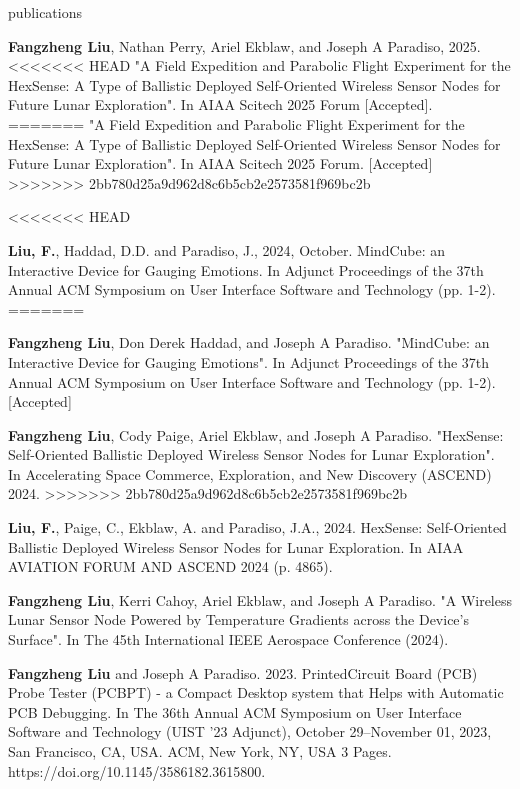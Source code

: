 \documentclass{resume} %
\begin{document}
\begin{rSection}{publications}
\begin{itemlabel}
\item \textbf{Fangzheng Liu}, Nathan Perry, Ariel Ekblaw, and Joseph A Paradiso, 2025.
<<<<<<< HEAD
"A Field Expedition and Parabolic Flight Experiment for the HexSense:
A Type of Ballistic Deployed Self-Oriented Wireless Sensor Nodes for Future Lunar Exploration".
In AIAA Scitech 2025 Forum [Accepted].
=======
"A Field Expedition and Parabolic Flight Experiment for the HexSense: A Type of Ballistic
Deployed Self-Oriented Wireless Sensor Nodes for Future Lunar Exploration".
In AIAA Scitech 2025 Forum.
[Accepted]
>>>>>>> 2bb780d25a9d962d8c6b5cb2e2573581f969bc2b
\smallskip
\smallskip
\smallskip

<<<<<<< HEAD
\item \textbf{Liu, F.}, Haddad, D.D. and Paradiso, J., 2024, October.
MindCube: an Interactive Device for Gauging Emotions.
In Adjunct Proceedings of the 37th Annual ACM Symposium on User Interface Software and Technology (pp. 1-2).
=======
\item \textbf{Fangzheng Liu}, Don Derek Haddad, and Joseph A Paradiso. "MindCube: an Interactive Device for Gauging Emotions".
In Adjunct Proceedings of the 37th Annual ACM Symposium on User Interface Software and Technology (pp. 1-2).
[Accepted]
\smallskip
\smallskip
\smallskip

\item \textbf{Fangzheng Liu}, Cody Paige, Ariel Ekblaw, and Joseph A Paradiso. "HexSense: Self-Oriented Ballistic Deployed Wireless Sensor Nodes for Lunar Exploration". In Accelerating Space Commerce, Exploration, and New Discovery (ASCEND) 2024.
>>>>>>> 2bb780d25a9d962d8c6b5cb2e2573581f969bc2b
\smallskip
\smallskip
\smallskip

\item \textbf{Liu, F.}, Paige, C., Ekblaw, A. and Paradiso, J.A., 2024.
HexSense: Self-Oriented Ballistic Deployed Wireless Sensor Nodes for Lunar Exploration.
In AIAA AVIATION FORUM AND ASCEND 2024 (p. 4865).
\smallskip
\smallskip
\smallskip

\item \textbf{Fangzheng Liu}, Kerri Cahoy, Ariel Ekblaw, and Joseph A Paradiso.
"A Wireless Lunar Sensor Node Powered by Temperature Gradients across the Device's Surface".
In The 45th International IEEE Aerospace Conference (2024).
\smallskip
\smallskip
\smallskip

\item \textbf{Fangzheng Liu} and Joseph A Paradiso. 2023.
PrintedCircuit Board (PCB) Probe Tester (PCBPT) - a Compact Desktop system that Helps with Automatic PCB Debugging.
In The 36th Annual ACM Symposium on User Interface Software and Technology (UIST '23 Adjunct),
October 29--November 01, 2023, San Francisco, CA, USA. ACM, New York, NY, USA 3 Pages. https://doi.org/10.1145/3586182.3615800.
\smallskip
\smallskip
\smallskip


\end{itemlabel}
\end{rSection}
\end{document}
